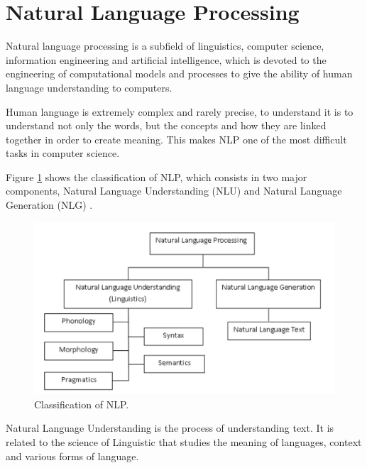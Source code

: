 \newpage
\section{Natural Language Processing}
\label{sec:nlp}

Natural language processing is a subfield of linguistics, computer science, information engineering and artificial intelligence, which is devoted to the engineering of computational models and processes to give the ability of human language understanding to computers. \cite{Khurana2018}  \par

Human language is extremely complex and rarely precise, to understand it is to understand not only the words, but the concepts and how they are linked together in order to create meaning. This makes NLP one of the most difficult tasks in computer science. \par

Figure \ref{fig:nlp_class} shows the classification of NLP, which consists in two major components, Natural Language Understanding (NLU) and Natural Language Generation (NLG) \cite{Khurana2018}.  \par




\begin{figure}[htb]
    \centering
    \includegraphics[scale = 0.3]{Sections/3StateOfTheArt/3_images/NLP_diagram.png}
    \caption{Classification of NLP. \cite{Khurana2018}}  
    \label{fig:nlp_class} 
\end{figure}

Natural Language Understanding is the process of understanding text. It is related to the science of Linguistic that studies the meaning of languages, context and various forms of language. 

